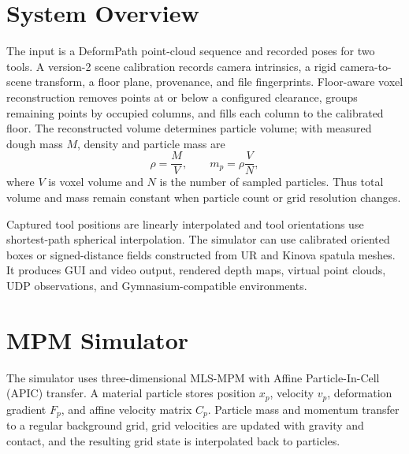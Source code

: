 \documentclass[conference]{IEEEtran}
\begin{document}
\section{System Overview}
The input is a DeformPath point-cloud sequence and recorded poses for two tools. A version-2 scene calibration records camera intrinsics, a rigid camera-to-scene transform, a floor plane, provenance, and file fingerprints. Floor-aware voxel reconstruction removes points at or below a configured clearance, groups remaining points by occupied columns, and fills each column to the calibrated floor. The reconstructed volume determines particle volume; with measured dough mass $M$, density and particle mass are
\begin{equation}
\rho=\frac{M}{V},\qquad m_p=\rho\frac{V}{N},
\end{equation}
where $V$ is voxel volume and $N$ is the number of sampled particles. Thus total volume and mass remain constant when particle count or grid resolution changes.

Captured tool positions are linearly interpolated and tool orientations use shortest-path spherical interpolation. The simulator can use calibrated oriented boxes or signed-distance fields constructed from UR and Kinova spatula meshes. It produces GUI and video output, rendered depth maps, virtual point clouds, UDP observations, and Gymnasium-compatible environments.

\section{MPM Simulator}
The simulator uses three-dimensional MLS-MPM with Affine Particle-In-Cell (APIC) transfer. A material particle stores position $x_p$, velocity $v_p$, deformation gradient $F_p$, and affine velocity matrix $C_p$. Particle mass and momentum transfer to a regular background grid, grid velocities are updated with gravity and contact, and the resulting grid state is interpolated back to particles.
\end{document}

